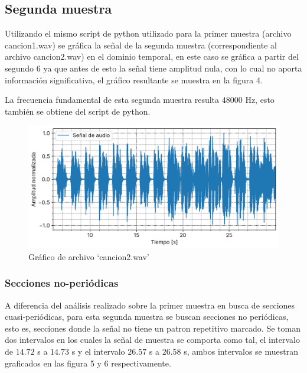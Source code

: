 \documentclass[12pt]{article}
\begin{document}
\hypertarget{segunda-muestra}{%
\subsection{Segunda muestra}\label{segunda-muestra}}

Utilizando el mismo script de python utilizado para la primer muestra
(archivo cancion1.wav) se gráfica la señal de la segunda
muestra (correspondiente al archivo cancion2.wav) en el dominio
temporal, en este caso se gráfica a partir del segundo 6 ya que antes de
esto la señal tiene amplitud nula, con lo cual no aporta información
significativa, el gráfico resultante se muestra en la figura 4.

La frecuencia fundamental de esta segunda muestra resulta \(48000\) Hz,
esto también se obtiene del script de python.

\begin{figure}
\centering
\includegraphics{plot/cancion2.png}
\caption{Gráfico de archivo `cancion2.wav'}
\label{cancion2}
\end{figure}

\hypertarget{secciones-no-periodicas}{%
\subsubsection{Secciones no-periódicas}\label{secciones-no-periodicas}}

A diferencia del análisis realizado sobre la primer muestra en busca de
secciones cuasi-periódicas, para esta segunda muestra se buscan
secciones no periódicas, esto es, secciones donde la señal no tiene un
patron repetitivo marcado. Se toman dos intervalos en los cuales la
señal de muestra se comporta como tal, el intervalo de \(14.72\) s a
\(14.73\) s y el intervalo \(26.57\) s a \(26.58\) s, ambos intervalos
se muestran graficados en las figura 5 y 6 respectivamente.
\end{document}
